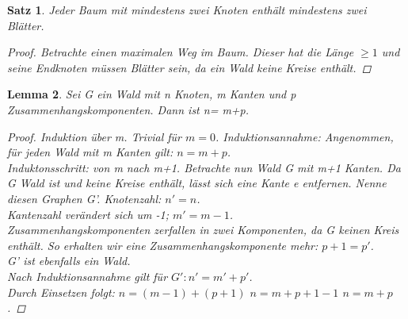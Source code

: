 \documentclass{article}
\newtheorem{satz}{Satz}
\newtheorem{lemma}[satz]{Lemma}
\begin{document}
  \begin{satz} 
    Jeder Baum mit mindestens zwei Knoten enthält mindestens zwei Blätter.
    \begin{proof}
      Betrachte einen maximalen Weg im Baum. Dieser hat die Länge $\geq 1$ und seine Endknoten müssen Blätter sein, da ein Wald keine Kreise enthält.
    \end{proof}
  \end{satz}
  \vspace{\baselineskip}

  \begin{lemma}
    Sei G ein Wald mit n Knoten, m Kanten und p Zusammenhangskomponenten. Dann ist n= m+p.
    \begin{proof}
    Induktion über m.
    Trivial für $m=0$.
    Induktionsannahme: Angenommen, für jeden Wald mit m Kanten gilt: $n=m+p$. \\
    Induktonsschritt: von m nach m+1.
    Betrachte nun Wald G mit m+1 Kanten. Da G Wald ist und keine Kreise enthält, lässt sich eine Kante e entfernen. Nenne diesen Graphen G'.
    Knotenzahl: $n'=n$.\\
    Kantenzahl verändert sich um -1; $m'= m-1$.\\
    Zusammenhangskomponenten zerfallen in zwei Komponenten, da G keinen Kreis enthält. So erhalten wir eine Zusammenhangskomponente mehr:
    $p+1=p'$.\\
    G' ist ebenfalls ein Wald.\\
    Nach Induktionsannahme gilt für $G': n'=m'+p'$.\\
    Durch Einsetzen folgt: $n=(m-1)+(p+1)$ \Leftrightarrow $n=m+p+1-1$ \Leftrightarrow $n=m+p$.
    \end{proof}
  \end{lemma}
  \vspace{\baselineskip}
\end{document}
